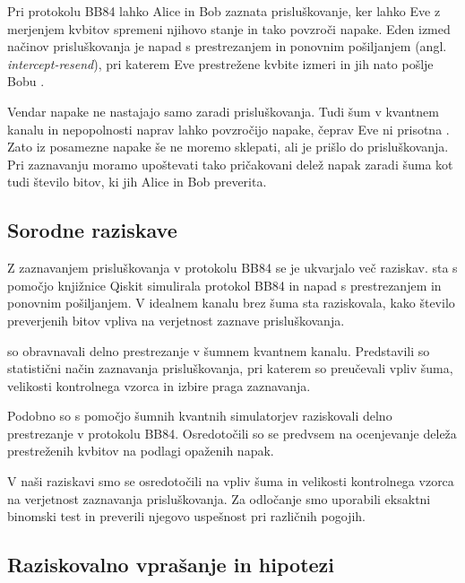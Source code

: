 Pri protokolu BB84 lahko Alice in Bob zaznata
prisluškovanje, ker lahko Eve z merjenjem kvbitov
spremeni njihovo stanje in tako povzroči napake.
Eden izmed načinov prisluškovanja je napad
s prestrezanjem in ponovnim pošiljanjem
(angl. \textit{intercept-resend}), pri katerem
Eve prestrežene kvbite izmeri in jih nato
pošlje Bobu \cite{g22:lee2023detection}.

Vendar napake ne nastajajo samo zaradi
prisluškovanja. Tudi šum v kvantnem kanalu
in nepopolnosti naprav lahko povzročijo
napake, čeprav Eve ni prisotna
\cite{g22:lee2023detection}.
Zato iz posamezne napake še ne moremo
sklepati, ali je prišlo do prisluškovanja.
Pri zaznavanju moramo upoštevati tako
pričakovani delež napak zaradi šuma kot
tudi število bitov, ki jih Alice in Bob
preverita.



\subsection{Sorodne raziskave}
\label{g22:sec:sorodne}

Z zaznavanjem prisluškovanja v protokolu BB84
se je ukvarjalo več raziskav.
\citet{g22:mina2020scalable} sta s pomočjo
knjižnice Qiskit simulirala protokol BB84
in napad s prestrezanjem in ponovnim pošiljanjem.
V idealnem kanalu brez šuma sta raziskovala,
kako število preverjenih bitov vpliva na
verjetnost zaznave prisluškovanja.

\citet{g22:lee2023detection} so obravnavali
delno prestrezanje v šumnem kvantnem kanalu.
Predstavili so statistični način zaznavanja
prisluškovanja, pri katerem so preučevali
vpliv šuma, velikosti kontrolnega vzorca
in izbire praga zaznavanja.

Podobno so \citet{g22:fiorini2024estimating}
s pomočjo šumnih kvantnih simulatorjev
raziskovali delno prestrezanje v protokolu
BB84. Osredotočili so se predvsem na
ocenjevanje deleža prestreženih kvbitov
na podlagi opaženih napak.

V naši raziskavi smo se osredotočili na
vpliv šuma in velikosti kontrolnega vzorca
na verjetnost zaznavanja prisluškovanja.
Za odločanje smo uporabili eksaktni
binomski test in preverili njegovo uspešnost
pri različnih pogojih.



\subsection{Raziskovalno vprašanje in hipotezi}
\label{g22:sec:vprasanje-hipoteze}


